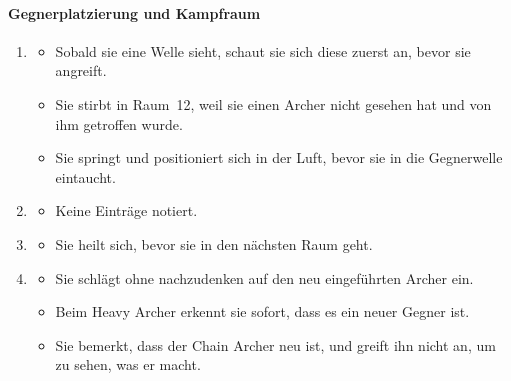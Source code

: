 \documentclass[../Main.tex]{subfiles}
\begin{document}
\paragraph{Gegnerplatzierung und Kampfraum}
\begin{enumerate}[label=\textbf{B\arabic*}, leftmargin=1.5cm, itemsep=0.8em, resume]
\item
\begin{itemize}[nosep]
\item Sobald sie eine Welle sieht, schaut sie sich diese zuerst an, bevor sie angreift.
\item Sie stirbt in Raum~12, weil sie einen Archer nicht gesehen hat und von ihm getroffen wurde.
\item Sie springt und positioniert sich in der Luft, bevor sie in die Gegnerwelle eintaucht.
\end{itemize}
\item
\begin{itemize}[nosep]
\item Keine Einträge notiert.
\end{itemize}
\item
\begin{itemize}[nosep]
\item Sie heilt sich, bevor sie in den nächsten Raum geht.
\end{itemize}
\item
\begin{itemize}[nosep]
\item Sie schlägt ohne nachzudenken auf den neu eingeführten Archer ein.
\item Beim Heavy Archer erkennt sie sofort, dass es ein neuer Gegner ist.
\item Sie bemerkt, dass der Chain Archer neu ist, und greift ihn nicht an, um zu sehen, was er macht.
\end{itemize}
\end{enumerate}
\end{document}
